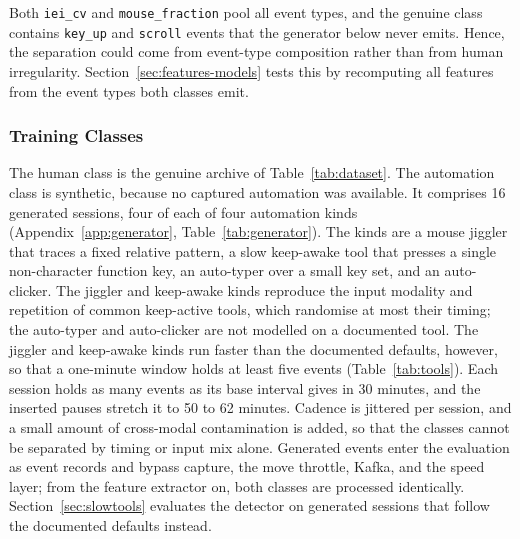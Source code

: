 \documentclass[sensors,article,submit,pdftex,oneauthor]{Definitions/mdpi}
\begin{document}
Both \texttt{iei\_cv} and \texttt{mouse\_fraction} pool all event types, and the genuine class contains \texttt{key\_up} and \texttt{scroll} events that the generator below never emits. Hence, the separation could come from event-type composition rather than from human irregularity. Section~\ref{sec:features-models} tests this by recomputing all features from the event types both classes emit.

\subsubsection{Training Classes}
\label{sec:training}
The human class is the genuine archive of Table~\ref{tab:dataset}. The automation class is synthetic, because no captured automation was available. It comprises 16 generated sessions, four of each of four automation kinds (Appendix~\ref{app:generator}, Table~\ref{tab:generator}). The kinds are a mouse jiggler that traces a fixed relative pattern, a slow keep-awake tool that presses a single non-character function key, an auto-typer over a small key set, and an auto-clicker. The jiggler and keep-awake kinds reproduce the input modality and repetition of common keep-active tools, which randomise at most their timing; the auto-typer and auto-clicker are not modelled on a documented tool. The jiggler and keep-awake kinds run faster than the documented defaults, however, so that a one-minute window holds at least five events (Table~\ref{tab:tools}). Each session holds as many events as its base interval gives in 30 minutes, and the inserted pauses stretch it to 50 to 62 minutes. Cadence is jittered per session, and a small amount of cross-modal contamination is added, so that the classes cannot be separated by timing or input mix alone. Generated events enter the evaluation as event records and bypass capture, the move throttle, Kafka, and the speed layer; from the feature extractor on, both classes are processed identically. Section~\ref{sec:slowtools} evaluates the detector on generated sessions that follow the documented defaults instead.


\end{document}
